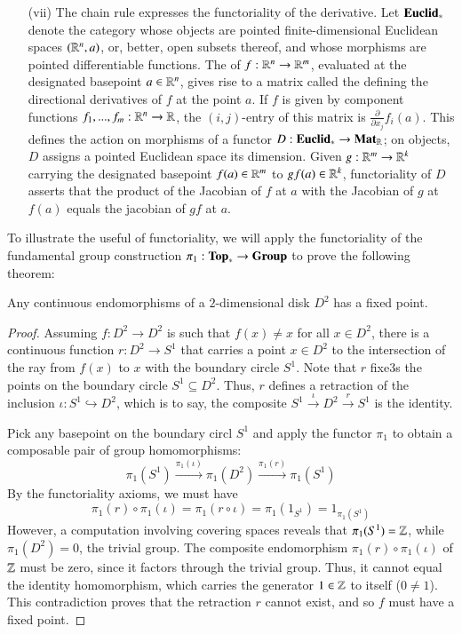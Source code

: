 \documentclass[12pt, a4paper, oneside, openright, titlepage]{book}
\begin{document}
\begin{eg}
\begin{enumerate}
        \item[(vii)] The chain rule expresses the functoriality of the derivative. Let $\normalfont\textbf{Euclid}_*$ denote the category whose objects are pointed finite-dimensional Euclidean spaces $(\mathbb R^n,a)$, or, better, open subsets thereof, and whose morphisms are pointed differentiable functions. The  of $f:\mathbb R^n\rightarrow \mathbb R^m$, evaluated at the designated basepoint $a \in \mathbb R^n$, gives rise to a matrix called the  defining the directional derivatives of $f$ at the point $a$. If $f$ is given by component functions $f_1,...,f_m:\mathbb R^n\rightarrow \mathbb R$, the $(i,j)$-entry of this matrix is $\frac{\partial}{\partial x_j}f_i(a)$. This defines the action on morphisms of a functor $D:\normalfont\textbf{Euclid}_*\rightarrow \normalfont\textbf{Mat}_{\mathbb R}$; on objects, $D$ assigns a pointed Euclidean space its dimension. Given $g:\mathbb R^m\rightarrow \mathbb R^k$ carrying the designated basepoint $f(a) \in \mathbb R^m$ to $gf(a) \in \mathbb R^k$, functoriality of $D$ asserts that the product of the Jacobian of $f$ at $a$ with the Jacobian of $g$ at $f(a)$ equals the jacobian of $gf$ at $a$.
    \end{enumerate}
\end{eg}

To illustrate the useful of functoriality, we will apply the functoriality of the fundamental group construction $\pi_1:\normalfont\textbf{Top}_*\rightarrow \normalfont\textbf{Group}$ to prove the following theorem: 

\begin{thm}
    Any continuous endomorphisms of a $2$-dimensional disk $D^2$ has a fixed point.
\end{thm}
\begin{proof}
    Assuming $f:D^2\rightarrow D^2$ is such that $f(x) \neq x$ for all $x \in D^2$, there is a continuous function $r:D^2\rightarrow S^1$ that carries a point $x \in D^2$ to the intersection of the ray from $f(x)$ to $x$ with the boundary circle $S^1$. Note that $r$ fixe3s the points on the boundary circle $S^1\subseteq D^2$. Thus, $r$ defines a retraction of the inclusion $\iota:S^1\hookrightarrow D^2$, which is to say, the composite $S^1\xrightarrow{\iota} D^2\xrightarrow{r}S^1$ is the identity. 

    Pick any basepoint on the boundary circl $S^1$ and apply the functor $\pi_1$ to obtain a composable pair of group homomorphisms: \begin{equation*}
        \pi_1(S^1)\xrightarrow{\pi_1(\iota)}\pi_1(D^2)\xrightarrow{\pi_1(r)}\pi_1(S^1)
    \end{equation*}
    By the functoriality axioms, we must have $$\pi_1(r)\circ\pi_1(\iota) = \pi_1(r\circ\iota) = \pi_1(1_{S^1}) = 1_{\pi_1(S^1)}$$
    However, a computation involving covering spaces reveals that $\pi_1(S^1) = \mathbb Z$, while $\pi_1(D^2) = 0$, the trivial group. The composite endomorphism $\pi_1(r)\circ \pi_1(\iota)$ of $\mathbb Z$ must be zero, since it factors through the trivial group. Thus, it cannot equal the identity homomorphism, which carries the generator $1 \in \mathbb Z$ to itself ($0 \neq 1$). This contradiction proves that the retraction $r$ cannot exist, and so $f$ must have a fixed point.
\end{proof}
\end{document}
